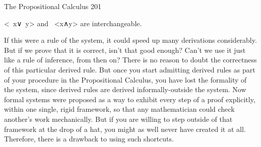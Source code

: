 The Propositional Calculus                                                               201

                        <~x∨~y> and ~<x∧y> are interchangeable.

If this were a rule of the system, it could speed up many derivations considerably. But if
we prove that it is correct, isn't that good enough? Can't we use it just like a rule of
inference, from then on?
        There is no reason to doubt the correctness of this particular derived rule. But
once you start admitting derived rules as part of your procedure in the Propositional
Calculus, you have lost the formality of the system, since derived rules are derived
informally-outside the system. Now formal systems were proposed as a way to exhibit
every step of a proof explicitly, within one single, rigid framework, so that any
mathematician could check another's work mechanically. But if you are willing to step
outside of that framework at the drop of a hat, you might as well never have created it at
all. Therefore, there is a drawback to using such shortcuts.

